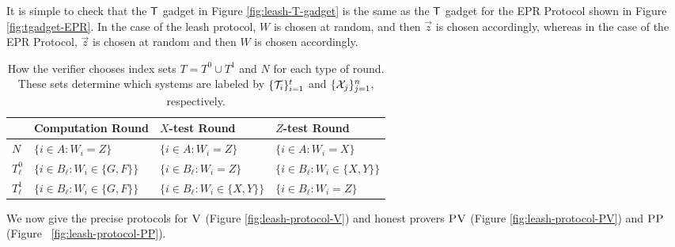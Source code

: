 \documentclass[11pt]{article}
\newcommand{\ver}{\textsc{V}}
\newcommand{\pv}{\textsc{PV}}
\newcommand{\pp}{\textsc{PP}}
\begin{document}
It is simple to check that the $\sf T$ gadget in Figure \ref{fig:leash-T-gadget} is the same as the $\sf T$ gadget for the EPR Protocol shown in Figure \ref{fig:tgadget-EPR}. In the case of the leash protocol, $W$ is chosen at random, and then $\vec{z}$ is chosen accordingly, whereas in the case of the EPR Protocol, $\vec{z}$ is chosen at random and then $W$ is chosen accordingly. 




\begin{table}[H]
\centering
\setlength\tabcolsep{1.5pt}
\begin{tabular}{|l|lll|}
\hline
& Computation Round & $X$-test Round & $Z$-test Round\\
\hline
$N$ %
& $\{i\in A:W_i=Z\}$ & $\{i\in A:W_i=Z\}$ & $\{i\in A:W_i=X\}$\\
$T^0_{\ell}$ %
& $\{i\in B_{\ell}:W_i\in \{G,F\}\}$ & $\{i\in B_{\ell}:W_i=Z\}$ & $\{i\in B_{\ell}:W_i\in \{X,Y\}\}$ \\
$T^1_{\ell}$ %
& $\{i\in B_{\ell}:W_i\in \{G,F\}\}$ & $\{i\in B_{\ell}:W_i\in \{X,Y\}\}$ & $\{i\in B_{\ell}:W_i=Z\}$ \\
\hline
\end{tabular}
\caption{How the verifier chooses index sets $T=T^0\cup T^1$ and $N$ for each type of round. These sets determine which systems are labeled by $\{{\cal T}_{i}\}_{i=1}^t$ and $\{{\cal X}_{j}\}_{j=1}^n$, respectively.}\label{tab:index-choices}
\end{table}

\noindent We now give the precise protocols for $\ver$ (Figure \ref{fig:leash-protocol-V})
and honest provers $\pv$ (Figure \ref{fig:leash-protocol-PV}) and $\pp$ (Figure~
\ref{fig:leash-protocol-PP}). 
\end{document}

